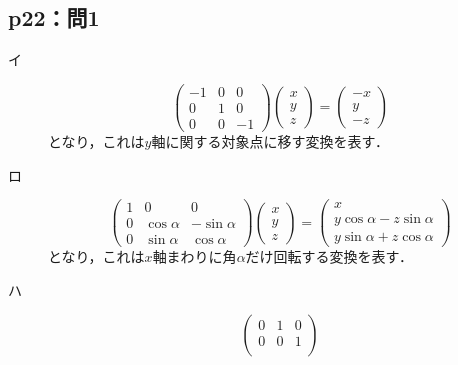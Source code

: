 \documentclass[uplatex,dvipdfmx,a4paper,11pt,fleqn]{jsarticle}
\begin{document}
\subsection*{p22：問1}
\begin{tleftbar}
\begin{description}
    \item[イ] 
    \[
        \begin{pmatrix}
            -1 & 0 & 0 \\
            0 & 1 & 0 \\
            0 & 0 & -1
        \end{pmatrix}
        \begin{pmatrix}
            x \\
            y \\
            z
        \end{pmatrix}
        =\begin{pmatrix}
            -x \\
            y \\
            -z
        \end{pmatrix}
        \]
        となり，これは$y$軸に関する対象点に移す変換を表す．
\item[ロ]
        \[
        \begin{pmatrix}
            1 & 0 & 0 \\
            0 & \cos \alpha & -\sin \alpha \\
            0 & \sin \alpha & \cos \alpha
        \end{pmatrix}
        \begin{pmatrix}
            x \\
            y \\
            z
        \end{pmatrix}
        =
        \begin{pmatrix}
            x \\
            y \cos \alpha -z \sin \alpha \\
            y \sin \alpha + z \cos \alpha 
        \end{pmatrix}
        \]
        となり，これは$x$軸まわりに角$\alpha$だけ回転する変換を表す．
    \item[ハ]
        \[
            \begin{pmatrix}
                0 & 1 & 0 \\
                0 & 0 & 1 \\

\end{pmatrix}\]
\end{description}
\end{tleftbar}
\end{document}
